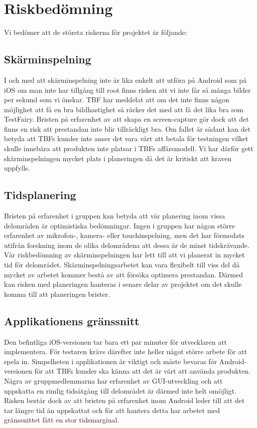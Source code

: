 \section{Riskbedömning}

Vi bedömer att de största riskerna för projektet är följande:

\subsection{Skärminspelning}
\label{subsec:screenrec}
I och med att skärminspelning inte är lika enkelt att utföra på Android som på iOS om man inte har tillgång till root finns risken att vi inte får så många bilder per sekund som vi önskar. TBF har meddelat att om det inte finns någon möjlighet att få en bra bildhastighet så räcker det med att få det lika bra som TestFairy. Bristen på erfarenhet av att skapa en screen-capture gör dock att det finns en risk att prestandan inte blir tillräckligt bra. Om fallet är sådant kan det betyda att TBFs kunder inte anser det vara värt att betala för testningen vilket skulle innebära att produkten inte platsar i TBFs affärsmodell. Vi har därför gett skärminspelningen mycket plats i planeringen då det är kritiskt att kraven uppfylls.

\subsection{Tidsplanering}
Bristen på erfarenhet i gruppen kan betyda att vår planering inom vissa delområden är optimistiska bedömningar. Ingen i gruppen har någon större erfarenhet av mikrofon-, kamera- eller touchinspelning, men det har förmodats utifrån forskning inom de olika delområdena att dessa är de minst tidskrävande. Vår riskbedömning av skärminspelningen har lett till att vi planerat in mycket tid för delområdet. Skärminspelningsarbetet kan vara flexibelt till viss del då mycket av arbetet kommer bestå av att försöka optimera prestandan. Därmed kan risken med planeringen hanteras i senare delar av projektet om det skulle komma till att planeringen brister.

\subsection{Applikationens gränssnitt}
Den befintliga iOS-versionen tar bara ett par minuter för utvecklaren att implementera. För testaren krävs därefter inte heller något större arbete för att spela in. Simpelheten i applikationen är viktigt och måste bevaras för Android-versionen för att TBFs kunder ska känna att det är värt att använda produkten. Några av gruppmedlemmarna har erfarenhet av GUI-utveckling och att uppskatta en rimlig tidsåtgång till delområdet är därmed inte helt omöjligt. Risken består dock av att bristen på erfarenhet inom Android leder till att det tar längre tid än uppskattat och för att hantera detta har arbetet med gränssnittet fått en stor tidsmarginal.
